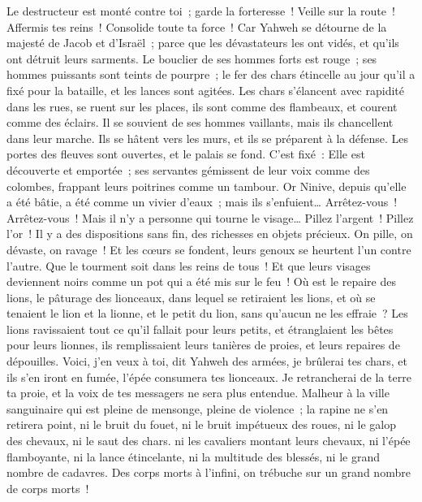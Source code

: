 \begin{multicols}{2}
Le destructeur est monté contre toi~; garde la forteresse~! Veille sur la route~! Affermis tes reins~! Consolide toute ta force~!
Car Yahweh se détourne de la majesté de Jacob et d'Israël~; parce que les dévastateurs les ont vidés, et qu'ils ont détruit leurs sarments.
Le bouclier de ses hommes forts est rouge~; ses hommes puissants sont teints de pourpre~; le fer des chars étincelle au jour qu'il a fixé pour la bataille, et les lances sont agitées.
Les chars s'élancent avec rapidité dans les rues, se ruent sur les places, ils sont comme des flambeaux, et courent comme des éclairs.
Il se souvient de ses hommes vaillants, mais ils chancellent dans leur marche. Ils se hâtent vers les murs, et ils se préparent à la défense.
Les portes des fleuves sont ouvertes, et le palais se fond.
C'est fixé~: Elle est découverte et emportée~; ses servantes gémissent de leur voix comme des colombes, frappant leurs poitrines comme un tambour.
Or Ninive, depuis qu'elle a été bâtie, a été comme un vivier d'eaux~; mais ils s'enfuient… Arrêtez-vous~! Arrêtez-vous~! Mais il n'y a personne qui tourne le visage…
Pillez l'argent~! Pillez l'or~! Il y a des dispositions sans fin, des richesses en objets précieux.
On pille, on dévaste, on ravage~! Et les cœurs se fondent, leurs genoux se heurtent l'un contre l'autre. Que le tourment soit dans les reins de tous~! Et que leurs visages deviennent noirs comme un pot qui a été mis sur le feu~!
Où est le repaire des lions, le pâturage des lionceaux, dans lequel se retiraient les lions, et où se tenaient le lion et la lionne, et le petit du lion, sans qu'aucun ne les effraie~?
Les lions ravissaient tout ce qu'il fallait pour leurs petits, et étranglaient les bêtes pour leurs lionnes, ils remplissaient leurs tanières de proies, et leurs repaires de dépouilles.
Voici, j'en veux à toi, dit Yahweh des armées, je brûlerai tes chars, et ils s'en iront en fumée, l'épée consumera tes lionceaux. Je retrancherai de la terre ta proie, et la voix de tes messagers ne sera plus entendue.
\VerseOne{}Malheur à la ville sanguinaire qui est pleine de mensonge, pleine de violence~; la rapine ne s'en retirera point,
ni le bruit du fouet, ni le bruit impétueux des roues, ni le galop des chevaux, ni le saut des chars.
ni les cavaliers montant leurs chevaux, ni l'épée flamboyante, ni la lance étincelante, ni la multitude des blessés, ni le grand nombre de cadavres. Des corps morts à l'infini, on trébuche sur un grand nombre de corps morts~!

\end{multicols}
